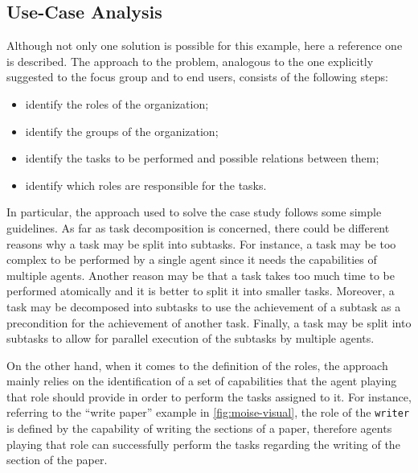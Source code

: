 \subsection{Use-Case Analysis}
Although not only one solution is possible for this example, here a reference one is described.
The approach to the problem, analogous to the one explicitly suggested to the focus group and to end users, consists of the following steps:
\begin{itemize}
    \item identify the roles of the organization;
    \item identify the groups of the organization;
    \item identify the tasks to be performed and possible relations between them;
    \item identify which roles are responsible for the tasks.
\end{itemize}
In particular, the approach used to solve the case study follows some simple guidelines.
As far as task decomposition is concerned, there could be different reasons why a task may be split into subtasks.
For instance, a task may be too complex to be performed by a single agent since it needs the capabilities of multiple agents.
Another reason may be that a task takes too much time to be performed atomically and it is better to split it into smaller tasks.
Moreover, a task may be decomposed into subtasks to use the achievement of a subtask as a precondition for the achievement of another task.
Finally, a task may be split into subtasks to allow for parallel execution of the subtasks by multiple agents.

On the other hand, when it comes to the definition of the roles, the approach mainly relies on the identification of a set of capabilities that the agent playing that role should provide in order to perform the tasks assigned to it.
For instance, referring to the ``write paper'' example in \cref{fig:moise-visual}, the role of the \texttt{writer} is defined by the capability of writing the sections of a paper, therefore agents playing that role can successfully perform the tasks regarding the writing of the section of the paper.

